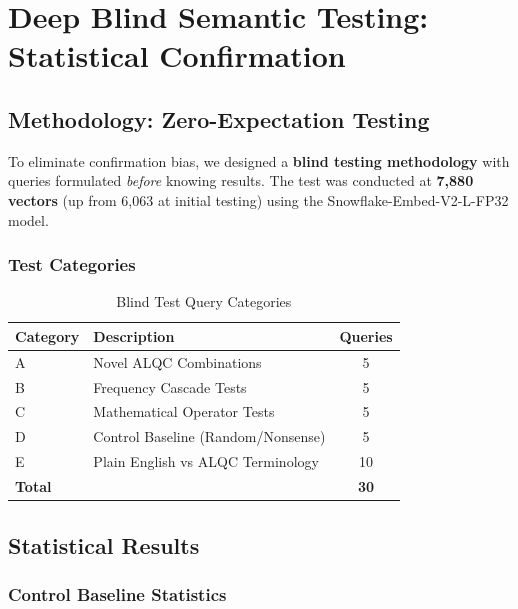 
\section{Deep Blind Semantic Testing: Statistical Confirmation}
\label{sec:deep-blind-testing}

\subsection{Methodology: Zero-Expectation Testing}

To eliminate confirmation bias, we designed a \textbf{blind testing methodology} with queries formulated \textit{before} knowing results. The test was conducted at \textbf{7,880 vectors} (up from 6,063 at initial testing) using the Snowflake-Embed-V2-L-FP32 model.

\subsubsection{Test Categories}

\begin{table}[h]
\centering
\caption{Blind Test Query Categories}
\begin{tabular}{|l|l|c|}
\hline
\textbf{Category} & \textbf{Description} & \textbf{Queries} \\
\hline
A & Novel ALQC Combinations & 5 \\
B & Frequency Cascade Tests & 5 \\
C & Mathematical Operator Tests & 5 \\
D & Control Baseline (Random/Nonsense) & 5 \\
E & Plain English vs ALQC Terminology & 10 \\
\hline
\textbf{Total} & & \textbf{30} \\
\hline
\end{tabular}
\end{table}

\subsection{Statistical Results}

\subsubsection{Control Baseline Statistics}

